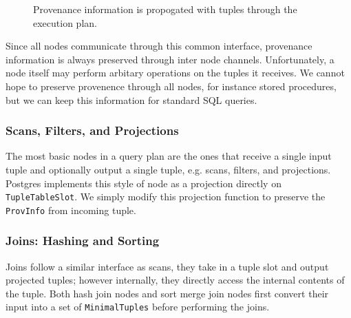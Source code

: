 \begin{figure}
  \centering
    
    
    \caption {Provenance information is propogated with tuples through the execution plan. }
\end{figure}

Since all nodes communicate through this common interface, provenance information is always preserved through inter node channels. Unfortunately, a node itself may perform arbitary operations on the tuples it receives. We cannot hope to preserve provenence through all nodes, for instance stored procedures, but we can keep this information for standard SQL queries.  
 
\subsubsection{Scans, Filters, and Projections}

The most basic nodes in a query plan are the ones that receive a single input tuple and optionally output a single tuple, e.g. scans, filters, and projections. Postgres implements this style of node as a projection directly on \texttt{TupleTableSlot}. We simply modify this projection function to preserve the \texttt{ProvInfo} from incoming tuple.

\subsubsection{Joins: Hashing and Sorting}

Joins follow a similar interface as scans, they take in a tuple slot and output projected tuples; however internally, they directly access the internal contents of the tuple. Both hash join nodes and sort merge join nodes first convert their input into a set of \texttt{MinimalTuples} before performing the joins. 

